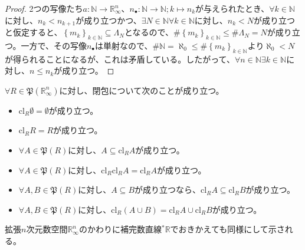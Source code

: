 \documentclass[dvipdfmx]{jsarticle}
\begin{document}
\begin{proof}
2つの写像たち$a:\mathbb{N} \rightarrow \mathbb{R}_{\infty}^{n}$、$n_{\bullet}:\mathbb{N} \rightarrow \mathbb{N};k \mapsto n_{k}$が与えられたとき、$\forall k \in \mathbb{N}$に対し、$n_{k} < n_{k + 1}$が成り立つかつ、$\exists N \in \mathbb{N}\forall k \in \mathbb{N}$に対し、$n_{k} < N$が成り立つと仮定すると、$\left\{ m_{k} \right\}_{k \in \mathbb{N}} \subseteq \varLambda_{N}$となるので、$\#\left\{ m_{k} \right\}_{k \in \mathbb{N}} \leq \#\varLambda_{N} = N$が成り立つ。一方で、その写像$n_{\bullet}$は単射なので、$\#\mathbb{N} = \aleph_{0} \leq \#\left\{ m_{k} \right\}_{k \in \mathbb{N}}$より$\aleph_{0} < N$が得られることになるが、これは矛盾している。したがって、$\forall n \in \mathbb{N}\exists k \in \mathbb{N}$に対し、$n \leq n_{k}$が成り立つ。
\end{proof}
\begin{thm}\label{4.1.3.10}
$\forall R \in \mathfrak{P}\left( \mathbb{R}_{\infty}^{n} \right)$に対し、閉包について次のことが成り立つ。
\begin{itemize}
\item
  $\mathrm{cl}_{R}\emptyset = \emptyset$が成り立つ。
\item
  $\mathrm{cl}_{R}R = R$が成り立つ。
\item
  $\forall A \in \mathfrak{P}(R)$に対し、$A \subseteq \mathrm{cl}_{R}A$が成り立つ。
\item
  $\forall A \in \mathfrak{P}(R)$に対し、$\mathrm{cl}_{R}{\mathrm{cl}_{R}A} = \mathrm{cl}_{R}A$が成り立つ。
\item
  $\forall A,B \in \mathfrak{P}(R)$に対し、$A \subseteq B$が成り立つなら、$\mathrm{cl}_{R}A \subseteq \mathrm{cl}_{R}B$が成り立つ。
\item
  $\forall A,B \in \mathfrak{P}(R)$に対し、$\mathrm{cl}_{R}(A \cup B) = \mathrm{cl}_{R}A \cup \mathrm{cl}_{R}B$が成り立つ。
\end{itemize}
拡張$n$次元数空間$\mathbb{R}_{\infty}^{n}$のかわりに補完数直線${}^{*}\mathbb{R}$でおきかえても同様にして示される。
\end{thm}
\end{document}

